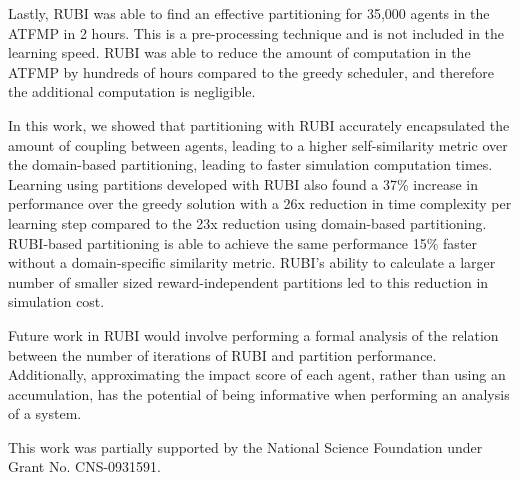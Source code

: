 \documentclass[smallcondensed]{svjour3}
\begin{document}
Lastly, RUBI was able to find an effective partitioning for 35,000 agents in the ATFMP in 2 hours. This is a pre-processing technique and is not included in the learning speed. RUBI was able to reduce the amount of computation in the ATFMP by hundreds of hours compared to the greedy scheduler, and therefore the additional computation is negligible. 

In this work, we showed that partitioning with RUBI accurately encapsulated the amount of coupling between agents, leading to a higher self-similarity metric over the domain-based partitioning, leading to faster simulation computation times. Learning using partitions developed with RUBI also found a 37\% increase in performance over the greedy solution with a 26x reduction in time complexity per learning step compared to the 23x reduction using domain-based partitioning. RUBI-based partitioning is able to achieve the same performance 15\% faster without a domain-specific similarity metric. RUBI's ability to calculate a larger number of smaller sized reward-independent partitions led to this reduction in simulation cost.

Future work in RUBI would involve performing a formal analysis of the relation between the number of iterations of RUBI and partition performance. Additionally, approximating the impact score of each agent, rather than using an accumulation, has the potential of being informative when performing an analysis of a system. %
\begin{acknowledgements}
This work was partially supported by the National Science Foundation under Grant No. CNS-0931591.
\end{acknowledgements}
\label{sec:CONCLUSION}




\end{document}
